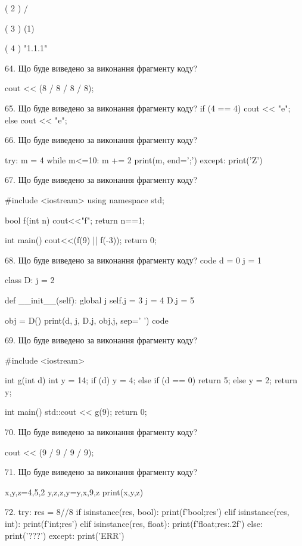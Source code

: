 \documentclass[11pt]{article}
\begin{document}
( 2 ) /

( 3 ) (1)

( 4 ) "1.1.1"

64. Що буде виведено за виконання фрагменту коду?

cout << (8 / 8 / 8 / 8);

65. Що буде виведено за виконання фрагменту коду?
if (4 == 4)
    cout << "e";
else
    cout << "e";


66. Що буде виведено за виконання фрагменту коду?

try:
    m = 4
    while m<=10:
        m += 2
    print(m, end=';')
except:
    print('Z')


67. Що буде виведено за виконання фрагменту коду?

#include <iostream>
using namespace std;

bool f(int n){
    cout<<"f";
    return n==1;
}

int main(){
    cout<<(f(9) || f(-3));
    return 0;
}

68. Що буде виведено за виконання фрагменту коду?
code
d = 0
j = 1

class D:
    j = 2
    
    def __init__(self):
global j        self.j = 3
        j = 4
        D.j = 5

obj = D()
print(d, j, D.j, obj.j, sep=' ')
code

69. Що буде виведено за виконання фрагменту коду?

#include <iostream>

int g(int d){
    int y = 14;
    if (d) 
        y = 4;
    else if (d == 0)
         return 5;
    else
         y = 2;
    return y;
}

int main(){
    std::cout << g(9);
    return 0;
}


70. Що буде виведено за виконання фрагменту коду?

cout << (9 / 9 / 9 / 9);

71. Що буде виведено за виконання фрагменту коду?

x,y,z=4,5,2
y,z,z,y=y,x,9,z
print(x,y,z)

72. 
try:
    res = 8//8%
    if isinstance(res, bool):
        print(f'bool;{res}')
    elif isinstance(res, int):
        print(f'int;{res}')
    elif isinstance(res, float):
        print(f'float;{res:.2f}')
    else:
        print('???')
except:
    print('ERR')
\end{document}
